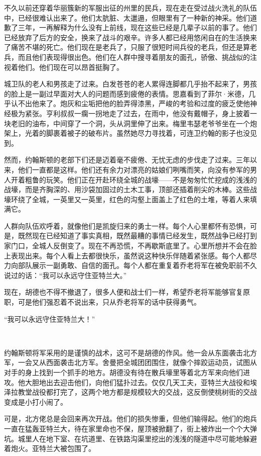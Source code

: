 \par 不久以前还穿着华丽簇新的军服出征的州里的民兵，现在走在受过战火洗礼的队伍中，已经很难认出来了。他们太肮脏、太邋遢，但眼里有了一种新的神采。他们道歉了三年，一再解释为什么没有上前线，现在这些已经是几辈子以前的事了。他们已经放弃了后方的安全，换来了战斗的艰辛。许多人都已经用悠闲自在的生活换来了痛苦不堪的死亡。他们现在是老兵了，只服了很短时间兵役的老兵，但还是算老兵，而且他们表现得很出色。他们在人群中搜寻着朋友的面孔，骄傲、挑战似的注视着他们。他们现在可以昂首挺胸了。
\par 城卫队的老人和男孩走了过来。白发苍苍的老人累得连脚都几乎抬不起来了，男孩的脸上是一副过早面对大人的问题而感到疲倦的表情。思嘉看到了菲尔·米德，几乎认不出他来了。炮灰和尘垢把他的脸弄得漆黑，严峻的考验和过度的疲乏使他神经极为紧张。亨利叔叔一瘸一拐地走了过去，在雨中，他没有戴帽子，身上披着一块老旧的油布，中间穿了一个洞，头从洞里伸了出来。梅里韦瑟老爷爷坐在一个炮架上，光着的脚裹着被子的破布片。虽然她尽力寻找着，可连卫约翰的影子也没见到。
\par 然而，约翰斯顿的老部下们还是迈着毫不疲倦、无忧无虑的步伐走了过来。三年以来，他们一直都是这样。他们还有余力对漂亮的姑娘们咧嘴而笑，向没有参军的男人开着粗鲁的玩笑。他们正在开赴环绕全城的战壕——不是匆匆忙忙挖成的浅浅的战壕，而是齐胸深的、用沙袋加固过的土木工事，顶部还插着削尖的木棒。这些战壕环绕了全城，一英里又一英里，红色的沟壑上面盖上了红色的土堆，等着人来填满它。
\par 人群向队伍欢呼着，就像他们是凯旋归来的勇士一样。每个人心里都怀有恐惧，可是，既然现在已经知道了事实真相，既然最糟的事情已经发生，既然战争已经打到家门口，全城人反倒变了。现在不再恐慌，不再歇斯底里了。心里所想并不会在脸上表现出来。每个人看上去都很快乐，虽然说这种快乐伴随着紧张感。每个人都尽力向部队展示一副勇敢、自信的面孔。每个人都在重复着乔老将军在被免职前不久说过的话：“我可以永远守住亚特兰大。”
\par 现在，胡德也不得不撤退了，很多人便和战士们一样，希望乔老将军能够官复原职，可是他们强忍着不说出来，只从乔老将军的话中获得勇气。
\par “我可以永远守住亚特兰大！”
\par  
\par 约翰斯顿将军采用的是谨慎的战术，这可不是胡德的作风。他一会从东面袭击北方军，一会又从西面袭击北方军。舍曼把全城团团围住，就像个摔跤运动员，试图从对手的身上找到一个抓手的地方。胡德没有待在散兵壕里等着北方军来向他们进攻。他大胆地出去迎击他们，向他们猛扑过去。仅仅几天工夫，亚特兰大战役和埃泽拉教堂战役都打完了，这两个地方都是规模较大的交战，这反倒使桃树街的交战变成是小打小闹了。
\par 可是，北方佬总是会回来再次开战。他们的损失惨重，但他们输得起。他们的炮兵一直在猛轰亚特兰大，待在家里命也不保，屋顶被掀翻了，街上被炸出一个个大弹坑。城里人在地下室、在坑道里、在铁路沟渠里挖出的浅浅的隧道中尽可能地躲避着炮火。亚特兰大被包围了。
